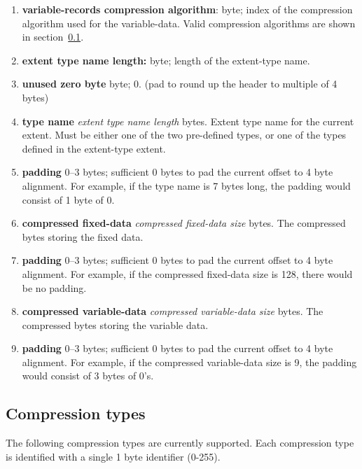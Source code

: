 \begin{enumerate}
  \item {\bf variable-records compression algorithm}: byte; index of the
    compression algorithm used for the variable-data.  Valid compression algorithms
    are shown in section~\ref{sec:ff:compression-types}.

  \item {\bf extent type name length:} byte; length of the extent-type
    name.

  \item {\bf unused zero byte} byte; 0.  (pad to round up the header to multiple of 4 bytes)

  \item {\bf type name} {\it extent type name length} bytes.  Extent
    type name for the current extent.  Must be either one of the two
    pre-defined types, or one of the types defined in the extent-type
    extent.

  \item {\bf padding} 0--3 bytes; sufficient 0 bytes to pad the
    current offset to 4 byte alignment.  For example, if the type name
    is 7 bytes long, the padding would consist of 1 byte of 0.

  \item {\bf compressed fixed-data} {\it compressed fixed-data size}
    bytes.  The compressed bytes storing the fixed data.

  \item {\bf padding} 0--3 bytes; sufficient 0 bytes to pad the
    current offset to 4 byte alignment.  For example, if the
    compressed fixed-data size is 128, there would be no padding.

  \item {\bf compressed variable-data} {\it compressed variable-data size}
    bytes.  The compressed bytes storing the variable data.

  \item {\bf padding} 0--3 bytes; sufficient 0 bytes to pad the
    current offset to 4 byte alignment.  For example, if the
    compressed variable-data size is 9, the padding would consist of 3
    bytes of 0's.
\end{enumerate}

\subsection{Compression types}
\label{sec:ff:compression-types}

The following compression types are currently supported.  Each
compression type is identified with a single 1 byte identifier (0-255).

